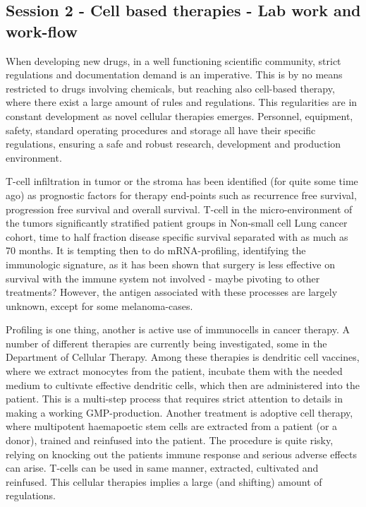 \documentclass[12p]{article}
\begin{document}
\subsection*{Session 2 - Cell based therapies - Lab work and work-flow}

When developing new drugs, in a well functioning scientific community, strict regulations and documentation demand is an imperative.
This is by no means restricted to drugs involving chemicals, but reaching also cell-based therapy, where there exist a large amount of rules and regulations.
This regularities are in constant development as novel cellular therapies emerges.
Personnel, equipment, safety, standard operating procedures and storage all have their specific regulations, ensuring a safe and robust research, development and production environment.

T-cell infiltration in tumor or the stroma has been identified (for quite some time ago) as prognostic factors for therapy end-points such as recurrence free survival, progression free survival and overall survival.
T-cell in the micro-environment of the tumors significantly stratified patient groups in Non-small cell Lung cancer cohort, time to half fraction disease specific survival separated with as much as 70 months.
It is tempting then to do mRNA-profiling, identifying the immunologic signature, as it has been shown that surgery is less effective on survival with the immune system not involved - maybe pivoting to other treatments?
However, the antigen associated with these processes are largely unknown, except for some melanoma-cases.

Profiling is one thing, another is active use of immunocells in cancer therapy.
A number of different therapies are currently being investigated, some in the Department of Cellular Therapy.
Among these therapies is dendritic cell vaccines, where we extract monocytes from the patient, incubate them with the needed medium to cultivate effective dendritic cells, which then are administered into the patient.
This is a multi-step process that requires strict attention to details in making a working GMP-production.
Another treatment is adoptive cell therapy, where multipotent haemapoetic stem cells are extracted from a patient (or a donor), trained and reinfused into the patient.
The procedure is quite risky, relying on knocking out the patients immune response and serious adverse effects can arise.
T-cells can be used in same manner, extracted, cultivated and reinfused.
This cellular therapies implies a large (and shifting) amount of regulations.
\end{document}
